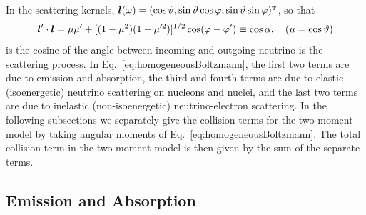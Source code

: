 \documentclass[10pt,preprint]{aastex}
\begin{document}
In the scattering kernels, $\boldsymbol{l}(\omega)=(\cos\vartheta,\sin\vartheta\cos\varphi,\sin\vartheta\sin\varphi)^{\mbox{\tiny T}}$, so that
\begin{equation}
 \boldsymbol{l}'\cdot\boldsymbol{l}  = \mu\mu' + [(1-\mu^2)(1-\mu'^{2})]^{1/2}\cos(\varphi-\varphi')
 \equiv \cos\alpha,
 \quad(\mu=\cos\vartheta)
\end{equation}
is the cosine of the angle between incoming and outgoing neutrino is the scattering process.  
In Eq.~\eqref{eq:homogeneousBoltzmann}, the first two terms are due to emission and absorption, the third and fourth terms are due to elastic (isoenergetic) neutrino scattering on nucleons and nuclei, and the last two terms are due to inelastic (non-isoenergetic) neutrino-electron scattering.  
In the following subsections we separately give the collision terms for the two-moment model by taking angular moments of Eq.~\eqref{eq:homogeneousBoltzmann}.  
The total collision term in the two-moment model is then given by the sum of the separate terms.  

\subsection{Emission and Absorption}
\end{document}
